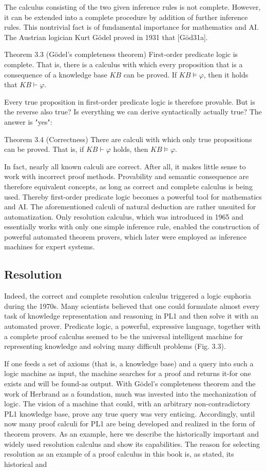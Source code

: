 \documentclass[10pt]{article}
\begin{document}
The calculus consisting of the two given inference rules is not complete. However, it can be extended into a complete procedure by addition of further inference rules. This nontrivial fact is of fundamental importance for mathematics and AI. The Austrian logician Kurt Gödel proved in 1931 that [Göd31a].

Theorem 3.3 (Gödel's completeness theorem) First-order predicate logic is complete. That is, there is a calculus with which every proposition that is a consequence of a knowledge base $K B$ can be proved. If $K B \models \varphi$, then it holds that $K B \vdash \varphi$.

Every true proposition in first-order predicate logic is therefore provable. But is the reverse also true? Is everything we can derive syntactically actually true? The answer is "yes":

Theorem 3.4 (Correctness) There are calculi with which only true propositions can be proved. That is, if $K B \vdash \varphi$ holds, then $K B \models \varphi$.

In fact, nearly all known calculi are correct. After all, it makes little sense to work with incorrect proof methods. Provability and semantic consequence are therefore equivalent concepts, as long as correct and complete calculus is being used. Thereby first-order predicate logic becomes a powerful tool for mathematics and AI. The aforementioned calculi of natural deduction are rather unsuited for automatization. Only resolution calculus, which was introduced in 1965 and essentially works with only one simple inference rule, enabled the construction of powerful automated theorem provers, which later were employed as inference machines for expert systems.

\subsection*{Resolution}
Indeed, the correct and complete resolution calculus triggered a logic euphoria during the 1970s. Many scientists believed that one could formulate almost every task of knowledge representation and reasoning in PL1 and then solve it with an automated prover. Predicate logic, a powerful, expressive language, together with a complete proof calculus seemed to be the universal intelligent machine for representing knowledge and solving many difficult problems (Fig. 3.3).

If one feeds a set of axioms (that is, a knowledge base) and a query into such a logic machine as input, the machine searches for a proof and returns it-for one exists and will be found-as output. With Gödel's completeness theorem and the work of Herbrand as a foundation, much was invested into the mechanization of logic. The vision of a machine that could, with an arbitrary non-contradictory PL1 knowledge base, prove any true query was very enticing. Accordingly, until now many proof calculi for PL1 are being developed and realized in the form of theorem provers. As an example, here we describe the historically important and widely used resolution calculus and show its capabilities. The reason for selecting resolution as an example of a proof calculus in this book is, as stated, its historical and
\end{document}
